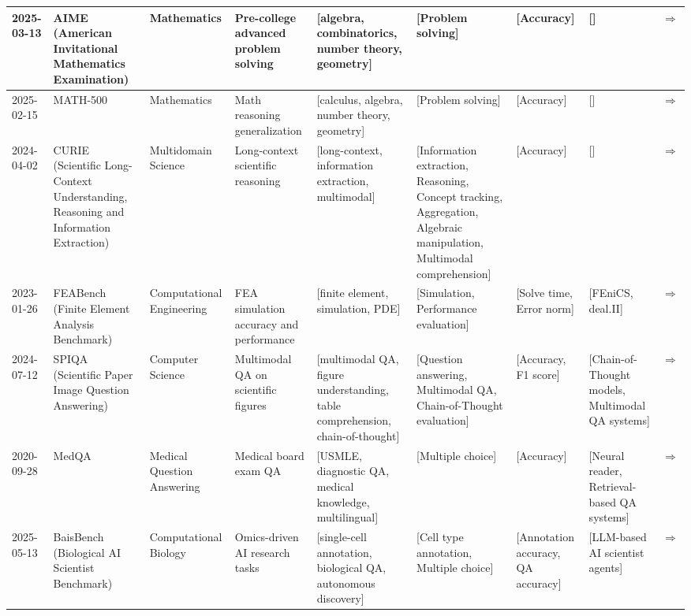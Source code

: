 \documentclass{article}
\begin{document}
\begin{landscape}
{\begin{longtable}{|p{1.5cm}|p{2.5cm}|p{2cm}|p{2cm}|p{2.5cm}|p{3cm}|p{2cm}|p{2cm}|p{1cm}|}
2025-03-13 & AIME (American Invitational Mathematics Examination) & Mathematics & Pre-college advanced problem solving & [algebra, combinatorics, number theory, geometry] & [Problem solving] & [Accuracy] & [] & \cite{www-aime} \href{https://www.vals.ai/benchmarks/aime-2025-03-13}{$\Rightarrow$ } \\ \hline
2025-02-15 & MATH-500 & Mathematics & Math reasoning generalization & [calculus, algebra, number theory, geometry] & [Problem solving] & [Accuracy] & [] & \cite{huggingface2025math500} \href{https://huggingface.co/datasets/HuggingFaceH4/MATH-500}{$\Rightarrow$ } \\ \hline
2024-04-02 & CURIE (Scientific Long-Context Understanding, Reasoning and Information Extraction) & Multidomain Science & Long-context scientific reasoning & [long-context, information extraction, multimodal] & [Information extraction, Reasoning, Concept tracking, Aggregation, Algebraic manipulation, Multimodal comprehension] & [Accuracy] & [] & \cite{curie2024} \href{https://arxiv.org/abs/2404.02029}{$\Rightarrow$ } \\ \hline
2023-01-26 & FEABench (Finite Element Analysis Benchmark) & Computational Engineering & FEA simulation accuracy and performance & [finite element, simulation, PDE] & [Simulation, Performance evaluation] & [Solve time, Error norm] & [FEniCS, deal.II] & \cite{allen2023feabench} \href{https://github.com/alleninstitute/feabench}{$\Rightarrow$ } \\ \hline
2024-07-12 & SPIQA (Scientific Paper Image Question Answering) & Computer Science & Multimodal QA on scientific figures & [multimodal QA, figure understanding, table comprehension, chain-of-thought] & [Question answering, Multimodal QA, Chain-of-Thought evaluation] & [Accuracy, F1 score] & [Chain-of-Thought models, Multimodal QA systems] & \cite{zhong2024spiqa} \href{https://arxiv.org/abs/2407.09413}{$\Rightarrow$ } \\ \hline
2020-09-28 & MedQA & Medical Question Answering & Medical board exam QA & [USMLE, diagnostic QA, medical knowledge, multilingual] & [Multiple choice] & [Accuracy] & [Neural reader, Retrieval-based QA systems] & \cite{jin2020what} \href{https://arxiv.org/abs/2009.13081}{$\Rightarrow$ } \\ \hline
2025-05-13 & BaisBench (Biological AI Scientist Benchmark) & Computational Biology & Omics-driven AI research tasks & [single-cell annotation, biological QA, autonomous discovery] & [Cell type annotation, Multiple choice] & [Annotation accuracy, QA accuracy] & [LLM-based AI scientist agents] & \cite{luo2025benchmarkingaiscientistsomics} \href{https://arxiv.org/abs/2505.08341}{$\Rightarrow$ } \\ \hline

\end{longtable}}
\end{landscape}
\end{document}
